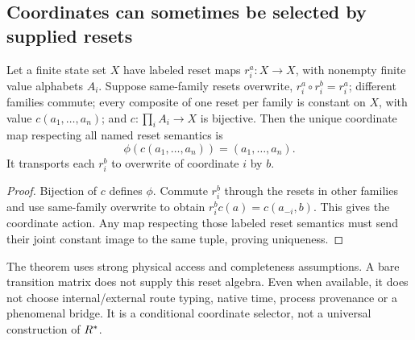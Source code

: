 \subsection{Coordinates can sometimes be selected by supplied resets}
\begin{proposition}\label{p2-34}
Let a finite state set \(X\) have labeled reset maps \(r_i^a:X\to X\), with nonempty finite value alphabets \(A_i\). Suppose same-family resets overwrite, \(r_i^a\circ r_i^b=r_i^a\); different families commute; every composite of one reset per family is constant on \(X\), with value \(c(a_1,\ldots,a_n)\); and \(c:\prod_iA_i\to X\) is bijective. Then the unique coordinate map respecting all named reset semantics is
\[
 \phi(c(a_1,\ldots,a_n))=(a_1,\ldots,a_n).
\]
It transports each \(r_i^b\) to overwrite of coordinate \(i\) by \(b\).
\end{proposition}
\begin{proof}
Bijection of \(c\) defines \(\phi\). Commute \(r_i^b\) through the resets in other families and use same-family overwrite to obtain
\(r_i^b c(a)=c(a_{-i},b)\). This gives the coordinate action. Any map respecting those labeled reset semantics must send their joint constant image to the same tuple, proving uniqueness.
\end{proof}
The theorem uses strong physical access and completeness assumptions. A bare transition matrix does not supply this reset algebra. Even when available, it does not choose internal/external route typing, native time, process provenance or a phenomenal bridge. It is a conditional coordinate selector, not a universal construction of \(R^{\ast}\).

